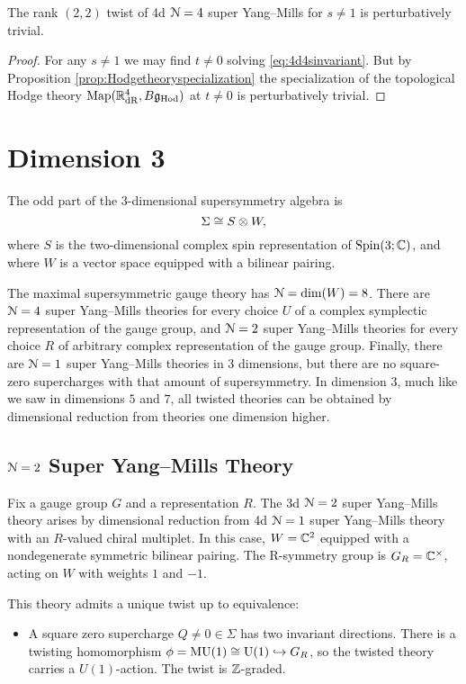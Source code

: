 \documentclass[10pt, oneside]{article}
\begin{document}
\begin{corollary}
The rank $(2, 2)$ twist of 4d $\mathcal N=4$ super Yang--Mills for $s\neq 1$ is perturbatively trivial.
\end{corollary}
\begin{proof}
For any $s\neq 1$ we may find $t\neq 0$ solving \eqref{eq:4d4sinvariant}. But by Proposition \ref{prop:Hodgetheoryspecialization} the specialization of the topological Hodge theory $\operatorname{Map}(\mathbb R^4_{\mathrm{dR}}, B\mathfrak g_{\mathrm{Hod}})$ at $t\neq 0$ is perturbatively trivial.
\end{proof}

\section{Dimension 3}
The odd part of the $3$-dimensional supersymmetry algebra is
\[
\Sigma \cong S \otimes W, 
\]
where $S$ is the two-dimensional complex spin representation of $\mathrm{Spin}(3;\mathbb C)$, and where $W$ is a vector space equipped with a bilinear pairing.  

The maximal supersymmetric gauge theory has $\mathcal{N}= \dim(W) = 8$.  
There are $\mathcal{N}=4$ super Yang--Mills theories for every choice $U$ of a complex symplectic representation of the gauge group, and $\mathcal{N}=2$ super Yang--Mills theories for every choice $R$ of arbitrary complex representation of the gauge group. 
Finally, there are $\mathcal N=1$ super Yang--Mills theories in 3 dimensions, but there are no square-zero supercharges with that amount of supersymmetry. In dimension $3$, much like we saw in dimensions $5$ and $7$, all twisted theories can be obtained by dimensional reduction from theories one dimension higher.

\subsection{\texorpdfstring{$\mathcal N = 2$}{N=2} Super Yang--Mills Theory}
\label{sect:3d_2_section}

Fix a gauge group $G$ and a representation $R$.  The 3d $\mathcal{N}=2$ super Yang--Mills theory arises by dimensional reduction from 4d $\mathcal{N}=1$ super Yang--Mills theory with an $R$-valued chiral multiplet.  In this case, $W = \mathbb C^2$ equipped with a nondegenerate symmetric bilinear pairing. The R-symmetry group is $G_R=\mathbb C^\times$, acting on $W$ with weights $1$ and $-1$.

This theory admits a unique twist up to equivalence:
\begin{itemize}
 \item A square zero supercharge $Q \ne 0 \in \Sigma$ has two invariant directions.  There is a twisting homomorphism $\phi = \mathrm{MU}(1)\cong \mathrm{U}(1)\hookrightarrow G_R$, so the twisted theory carries a $U(1)$-action. The twist is $\mathbb Z$-graded.
\end{itemize}
\end{document}
